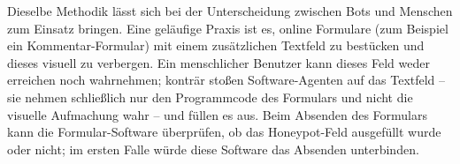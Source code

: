 Dieselbe Methodik lässt sich bei der Unterscheidung zwischen Bots und Menschen
zum Einsatz bringen. Eine geläufige Praxis ist es, online Formulare (zum
Beispiel ein Kommentar-Formular) mit einem zusätzlichen Textfeld zu bestücken
und dieses visuell zu verbergen. Ein menschlicher Benutzer kann dieses Feld
weder erreichen noch wahrnehmen; konträr stoßen Software-Agenten auf das
Textfeld – sie nehmen schließlich nur den Programmcode des Formulars und nicht
die visuelle Aufmachung wahr – und füllen es aus. Beim Absenden des Formulars
kann die Formular-Software überprüfen, ob das Honeypot-Feld ausgefüllt wurde
oder nicht; im ersten Falle würde diese Software das Absenden unterbinden.
